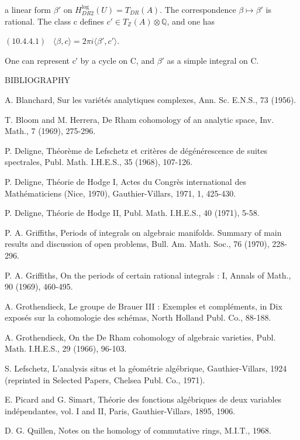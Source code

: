 \documentclass[11pt,twoside]{article}
\newcommand{\DFormula}[1]{%
  \par\smallskip\noindent\hspace*{0pt}\(\displaystyle #1\)\par\smallskip
}
\begin{document}
a linear form \(\beta ′\) on \(H_{DR2}^{\operatorname{log}}(U)=T_{DR}(A)\). The correspondence \(\beta ↦\beta ′\) is rational. The class c defines \(c′\in T_{\mathbb{Z}}(A)\otimes \mathbb{Q}\), and one has\par
\par\medskip
\DFormula{(10.4.4.1)\,\,\,\,\,⟨\beta ,c⟩=2\pi i⟨\beta ′,c′⟩.}
\par\medskip
One can represent c′ by a cycle on C, and \(\beta ′\) as a simple integral on C.\par
\par\medskip
BIBLIOGRAPHY\par
\par\medskip
[1] A. Blanchard, Sur les variétés analytiques complexes, Ann. Sc. E.N.S., 73 (1956).\par
[2] T. Bloom and M. Herrera, De Rham cohomology of an analytic space, Inv. Math., 7 (1969), 275-296.\par
[3] P. Deligne, Théorème de Lefschetz et critères de dégénérescence de suites spectrales, Publ. Math. I.H.E.S., 35 (1968), 107-126.\par
[4] P. Deligne, Théorie de Hodge I, Actes du Congrès international des Mathématiciens (Nice, 1970), Gauthier-Villars, 1971, 1, 425-430.\par
[5] P. Deligne, Théorie de Hodge II, Publ. Math. I.H.E.S., 40 (1971), 5-58.\par
[6] P. A. Griffiths, Periods of integrals on algebraic manifolds. Summary of main results and discussion of open problems, Bull. Am. Math. Soc., 76 (1970), 228-296.\par
[7] P. A. Griffiths, On the periods of certain rational integrals : I, Annals of Math., 90 (1969), 460-495.\par
[8] A. Grothendieck, Le groupe de Brauer III : Exemples et compléments, in Dix exposés sur la cohomologie des schémas, North Holland Publ. Co., 88-188.\par
[9] A. Grothendieck, On the De Rham cohomology of algebraic varieties, Publ. Math. I.H.E.S., 29 (1966), 96-103.\par
[10] S. Lefschetz, L’analysis situs et la géométrie algébrique, Gauthier-Villars, 1924 (reprinted in Selected Papers, Chelsea Publ. Co., 1971).\par
[11] E. Picard and G. Simart, Théorie des fonctions algébriques de deux variables indépendantes, vol. I and II, Paris, Gauthier-Villars, 1895, 1906.\par
[12] D. G. Quillen, Notes on the homology of commutative rings, M.I.T., 1968.\par
\end{document}
